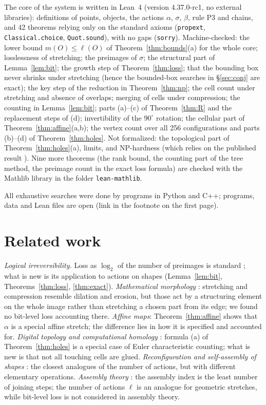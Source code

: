 \documentclass[11pt,a4paper]{article}
\theoremstyle{plain}
\theoremstyle{definition}
\theoremstyle{remark}
\begin{document}
The core of the system is written in Lean~4 \cite{lean} (version 4.37.0-rc1, no external libraries): definitions of points, objects, the actions $\alpha$, $\sigma$, $\beta$, rule P3 and chains, and 42 theorems relying only on the standard axioms (\texttt{propext}, \texttt{Classical.choice}, \texttt{Quot.sound}), with no gaps (\texttt{sorry}). Machine-checked: the lower bound $m(O)\le\ell(O)$ of Theorem~\ref{thm:bounds}(a) for the whole core; losslessness of stretching; the preimages of $\sigma$; the structural part of Lemma~\ref{lem:bit}; the growth step of Theorem~\ref{thm:loss}; that the bounding box never shrinks under stretching (hence the bounded-box searches in §\ref{sec:conj} are exact); the key step of the reduction in Theorem~\ref{thm:np}; the cell count under stretching and absence of overlaps; merging of cells under compression; the counting in Lemma~\ref{lem:bit}; parts (a)–(c) of Theorem~\ref{thm:R} and the replacement steps of (d); invertibility of the $90^\circ$ rotation; the cellular part of Theorem~\ref{thm:affine}(a,b); the vertex count over all 256 configurations and parts (b)–(d) of Theorem~\ref{thm:holes}. Not formalized: the topological part of Theorem~\ref{thm:holes}(a), limits, and NP-hardness (which relies on the published result \cite{jiang}). Nine more theorems (the rank bound, the counting part of the tree method, the preimage count in the exact loss formula) are checked with the Mathlib library in the folder \texttt{lean-mathlib}.

All exhaustive searches were done by programs in Python and C++; programs, data and Lean files are open (link in the footnote on the first page).

\section{Related work}

\emph{Logical irreversibility.} Loss as $\log_2$ of the number of preimages is standard \cite{landauer,frank}; what is new is its application to actions on shapes (Lemma~\ref{lem:bit}, Theorems~\ref{thm:loss}, \ref{thm:exact}).
\emph{Mathematical morphology} \cite{serra}: stretching and compression resemble dilation and erosion, but those act by a structuring element on the whole image rather than stretching a chosen part from its edge; we found no bit-level loss accounting there.
\emph{Affine maps}: Theorem~\ref{thm:affine} shows that $\alpha$ is a special affine stretch; the difference lies in how it is specified and accounted for.
\emph{Digital topology and computational homology} \cite{kong,kaczynski,toriwaki}: formula (a) of Theorem~\ref{thm:holes} is a special case of Euler characteristic counting; what is new is that not all touching cells are glued.
\emph{Reconfiguration and self-assembly of shapes} \cite{akitaya,soloveichik}: the closest analogues of the number of actions, but with different elementary operations.
\emph{Assembly theory} \cite{assembly}: the assembly index is the least number of joining steps; the number of actions $\ell$ is an analogue for geometric stretches, while bit-level loss is not considered in assembly theory.
\end{document}
